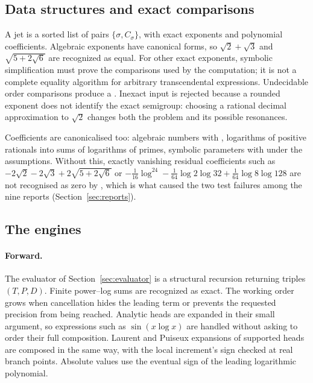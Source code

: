 \subsection{Data structures and exact comparisons}

A jet is a sorted list of pairs $\{\sigma,C_\sigma\}$, with exact exponents and polynomial coefficients. Algebraic exponents have  canonical forms, so $\sqrt2+\sqrt3$ and $\sqrt{5+2\sqrt6}$ are recognized as equal. For other exact exponents, symbolic simplification must prove the comparisons used by the computation; it is not a complete equality algorithm for arbitrary transcendental expressions. Undecidable order comparisons produce a . Inexact  input is rejected because a rounded exponent does not identify the exact semigroup: choosing a rational decimal approximation to $\sqrt2$ changes both the problem and its possible resonances.

Coefficients are canonicalised too: algebraic numbers with , logarithms of positive rationals into sums of logarithms of primes, symbolic parameters with  under the assumptions. Without this, exactly vanishing residual coefficients such as $-2\sqrt2-2\sqrt3+2\sqrt{5+2\sqrt6}$ or $-\tfrac1{16}\log^24-\tfrac1{64}\log2\log32+\tfrac1{64}\log8\log128$ are not recognised as zero by , which is what caused the two test failures among the nine reports (Section~\ref{sec:reports}).

\subsection{The engines}

\paragraph{Forward.} The evaluator of Section~\ref{sec:evaluator} is a structural recursion returning triples $(T,P,D)$. Finite power--log sums are recognized as exact. The working order grows when cancellation hides the leading term or prevents the requested precision from being reached. Analytic heads are expanded in their small argument, so expressions such as $\sin(x\log x)$ are handled without asking  to order their full composition. Laurent and Puiseux expansions of supported heads are composed in the same way, with the local increment's sign checked at real branch points. Absolute values use the eventual sign of the leading logarithmic polynomial.


